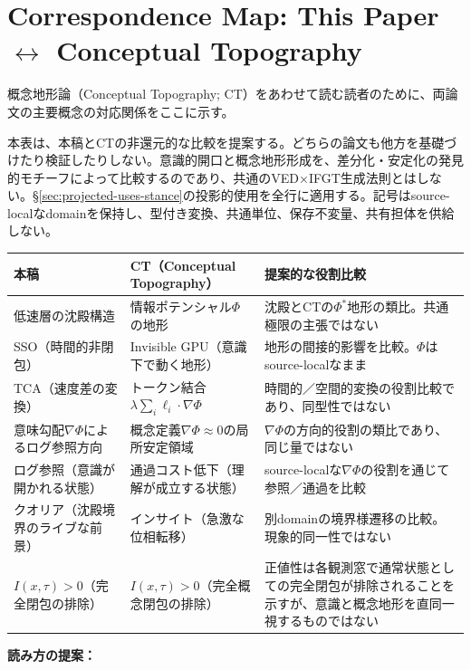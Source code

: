 \section{Correspondence Map: This Paper \texorpdfstring{$\leftrightarrow$}{<->} Conceptual Topography}

概念地形論（Conceptual Topography; CT）をあわせて読む読者のために、両論文の主要概念の対応関係をここに示す。

本表は、本稿とCTの非還元的な比較を提案する。どちらの論文も他方を基礎づけたり検証したりしない。意識的開口と概念地形形成を、差分化・安定化の発見的モチーフによって比較するのであり、共通のVED×IFGT生成法則とはしない。§\ref{sec:projected-uses-stance}の投影的使用を全行に適用する。記号はsource-localなdomainを保持し、型付き変換、共通単位、保存不変量、共有担体を供給しない。

\begin{table}[H]
\centering
\small
\begin{tabularx}{\textwidth}{>{\raggedright\arraybackslash}X >{\raggedright\arraybackslash}X >{\raggedright\arraybackslash}X}
\toprule
本稿 & CT（Conceptual Topography） & 提案的な役割比較 \\
\midrule
低速層の沈殿構造 & 情報ポテンシャル$\Phi$の地形 & 沈殿とCTの$\Phi^*$地形の類比。共通極限の主張ではない \\
SSO（時間的非閉包） & Invisible GPU（意識下で動く地形） & 地形の間接的影響を比較。$\Phi$はsource-localなまま \\
TCA（速度差の変換） & トークン結合$\lambda\sum_i \ell_i \cdot \nabla\Phi$ & 時間的／空間的変換の役割比較であり、同型性ではない \\
意味勾配$\nabla\Phi$によるログ参照方向 & 概念定義$\nabla\Phi\approx 0$の局所安定領域 & $\nabla\Phi$の方向的役割の類比であり、同じ量ではない \\
ログ参照（意識が開かれる状態） & 通過コスト低下（理解が成立する状態） & source-localな$\nabla\Phi$の役割を通じて参照／通過を比較 \\
クオリア（沈殿境界のライブな前景） & インサイト（急激な位相転移） & 別domainの境界様遷移の比較。現象的同一性ではない \\
$I(x,\tau) > 0$（完全閉包の排除） & $I(x,\tau) > 0$（完全概念閉包の排除） & 正値性は各観測窓で通常状態としての完全閉包が排除されることを示すが、意識と概念地形を直同一視するものではない \\
\bottomrule
\end{tabularx}
\end{table}

\textbf{読み方の提案：}

